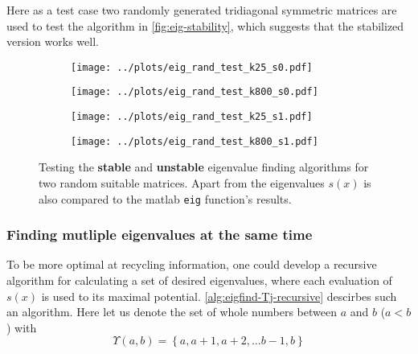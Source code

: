 \documentclass{article}
\begin{document}
Here as a test case two randomly generated tridiagonal symmetric matrices are used to test the algorithm in \autoref{fig:eig-stability}, which suggests that the stabilized version works well.
\begin{figure}[h!]
	\centering
	\begin{subfigure}{0.35\textheight}
		\centering
		\texttt{[image: ../plots/eig\_rand\_test\_k25\_s0.pdf]}
	\end{subfigure}
	\begin{subfigure}{0.35\textheight}
	\centering
	\texttt{[image: ../plots/eig\_rand\_test\_k800\_s0.pdf]}
	\end{subfigure}
	
	\begin{subfigure}{0.35\textheight}
	\centering
	\texttt{[image: ../plots/eig\_rand\_test\_k25\_s1.pdf]}
	\end{subfigure}
	\begin{subfigure}{0.35\textheight}
	\centering
	\texttt{[image: ../plots/eig\_rand\_test\_k800\_s1.pdf]}
	\end{subfigure}
	
	\caption{Testing the \textbf{stable} and \textbf{unstable} eigenvalue finding algorithms for two random suitable matrices. Apart from the eigenvalues $s(x)$ is also compared to the matlab \texttt{eig} function's results.}\label{fig:eig-stability}
\end{figure}

\subsubsection*{Finding mutliple eigenvalues at the same time}

To be more optimal at recycling information, one could develop a recursive algorithm for calculating a set of desired eigenvalues, where each evaluation of $s(x)$ is used to its maximal potential. \autoref{alg:eigfind-Tj-recursive} descirbes such an algorithm. Here let us denote the set of whole numbers between $a$ and $b$ ($a<b$) with 
\begin{equation*}
	\Upsilon(a,b) = \left\lbrace a, a+1, a+2, \dots b-1, b\right\rbrace
\end{equation*}
\end{document}
